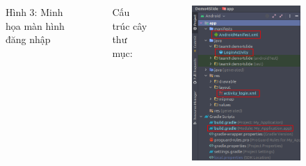 \documentclass{beamer}
\begin{document}
\begin{frame}
\begin{columns}
\begin{figure}
            \caption{\centering\tiny{Hình 3: Minh họa màn hình đăng nhập}}
        \end{figure}
        \indent Cấu trúc cây thư mục:
        \begin{figure}
            \centering
            \includegraphics[height=0.68\textheight]{images/25.png}
        \end{figure}
    \end{columns}
\end{frame}
\end{document}
